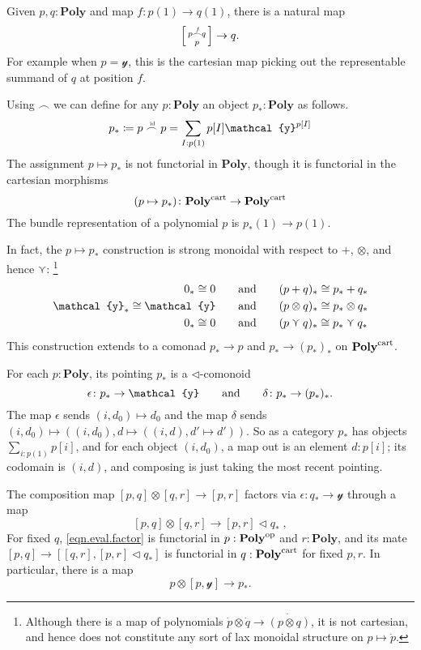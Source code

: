 \documentclass[11pt, one side, article]{memoir}
\makeatletter
\theoremstyle{definition}
\theoremstyle{plain}
\newcommand{\Cat}[1]{\mathbf{#1}}%
\newcommand{\id}{\mathrm{id}}
\newcommand{\op}{^\tn{op}}
\newcommand{\tn}[1]{\textnormal{#1}}
\newcommand{\yon}{{\mathcal{y}}}
\newcommand{\poly}{\Cat{Poly}}
\newcommand{\cart}{\tn{cart}}
\newcommand{\polycart}{\poly^\cart}
\newcommand{\0}{\textsf{0}}
\newcommand{\1}{\tn{\textsf{1}}}
\newcommand{\tri}{\mathbin{\triangleleft}}
\newcommand{\biglens}[2]{
     \begin{bmatrix}{\vphantom{f_f^f}#2} \\ {\vphantom{f_f^f}#1} \end{bmatrix}
}
\newcommand{\littlelens}[2]{
     \begin{bsmallmatrix}{\vphantom{f}#2} \\ {\vphantom{f}#1} \end{bsmallmatrix}
}
\newcommand{\lens}[2]{
  \relax\if@display
     \biglens{#1}{#2}
  \else
     \littlelens{#1}{#2}
  \fi
}
\newcommand{\indexcoclscale}[1]{\scalebox{.7}{#1}}
\newcommand{\cocl}[1]{
	\scriptsize\overset{\,\indexcoclscale{$#1$}}{\frown}\normalsize
}
\newcommand{\hh}[2][]{#1 \tn{#2} #1}
\newcommand{\qqand}{\hh[\qquad]{and}}
\newcommand{\OR}{\curlyvee}
\makeatother
\begin{document}
Given $p,q:\poly$ and map $f\colon p(1)\to q(1)$, there is a natural map
\begin{equation}
	\lens{p}{p\cocl{f}q}\to q.
\end{equation}
For example when $p=\yon$, this is the cartesian map picking out the representable summand of $q$ at position $f$.

Using $\frown$ we can define for any $p:\poly$ an object $p_*:\poly$ as follows.
\begin{equation}\label{eqn.p_star}
p_*\coloneqq p\cocl{\id}p=\sum_{I: p(1)}p[I]\yon^{p[I]}
\end{equation}
The assignment $p\mapsto p_*$ is not functorial in $\poly$, though it is functorial in the cartesian morphisms
\begin{equation}
	(p\mapsto p_*)\colon\polycart\to\polycart
\end{equation}
The bundle representation of a polynomial $p$ is $p_*(1)\to p(1)$.

In fact, the $p\mapsto p_*$ construction is strong monoidal with respect to $+$, $\otimes$, and hence $\OR$:%
\footnote{Although there is a map of polynomials $\dot{p}\otimes\dot{q}\to\dot{(p\otimes q)}$, it is not cartesian, and hence does not constitute any sort of lax monoidal structure on $p\mapsto\dot{p}$.}
\begin{align}
	0_*\cong 0
	&\qqand
	(p+q)_*\cong p_*+q_*\\
	\yon_*\cong\yon
	&\qqand
	(p\otimes q)_*\cong p_*\otimes q_*\\
	0_*\cong0
	&\qqand
	(p\OR q)_*\cong p_*\OR q_*
\end{align}
This construction extends to a comonad $p_*\to p$ and $p_*\to (p_*)_*$ on $\polycart$. 

For each $p:\poly$, its pointing $p_*$ is a $\tri$-comonoid
\begin{equation}\label{eqn.pointing_comonad}
	\epsilon\colon p_*\to\yon
	\qqand
	\delta\colon p_*\to (p_*)_*.
\end{equation}
The map $\epsilon$ sends $(i,d_0)\mapsto d_0$ and the map $\delta$ sends $(i,d_0)\mapsto((i,d_0), d\mapsto ((i,d), d'\mapsto d'))$. So as a category $p_*$ has objects $\sum_{i:p(1)}p[i]$, and for each object $(i,d_0)$, a map out is an element $d:p[i]$; its codomain is $(i,d)$, and composing is just taking the most recent pointing.

The composition map $[p,q]\otimes [q,r]\to [p,r]$ factors via $\epsilon\colon q_*\to \yon$ through a map
\begin{equation}\label{eqn.eval.factor}
	[p,q]\otimes [q,r]\to [p,r]\tri q_*\;,
\end{equation}
For fixed $q$, \cref{eqn.eval.factor} is functorial in $p:\poly\op$ and $r:\poly$, and its mate $[p,q]\to[[q,r],[p,r]\tri q_*]$ is functorial in $q:\polycart$ for fixed $p,r$. In particular, there is a map
\begin{equation}
p\otimes[p,\yon]\to p_*.
\end{equation}
\end{document}
